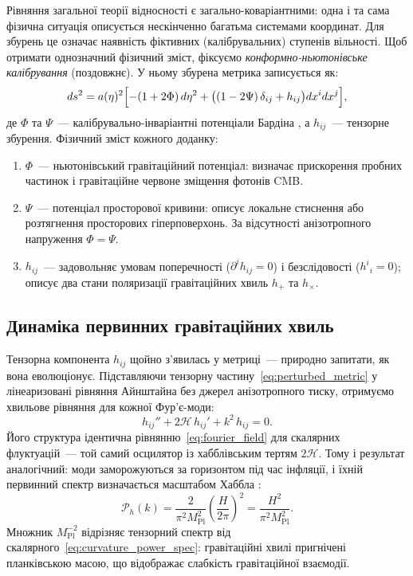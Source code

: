 \documentclass[12pt, a4paper]{article}
\begin{document}
Рівняння загальної теорії відносності є загально-коваріантними: одна і та сама фізична
ситуація описується нескінченно багатьма системами координат.
Для збурень це означає наявність фіктивних (калібрувальних)
ступенів вільності. Щоб отримати однозначний фізичний зміст,
фіксуємо \emph{конформно-ньютонівське калібрування} (поздовжнє).
У ньому збурена метрика записується як:
\begin{equation}\label{eq:perturbed_metric}
  ds^2 = a(\eta)^2\Bigl[
    -(1 + 2\Phi)\,d\eta^2
    + \bigl((1 - 2\Psi)\,\delta_{ij} + h_{ij}\bigr)
      dx^i dx^j
  \Bigr],
\end{equation}
де $\Phi$ та $\Psi$~--- калібрувально-інваріантні потенціали
Бардіна \cite{bardeen_1980}, а $h_{ij}$~--- тензорне збурення.
Фізичний зміст кожного доданку:
\begin{enumerate}
  \item $\Phi$~--- ньютонівський гравітаційний потенціал:
        визначає прискорення пробних частинок і гравітаційне
        червоне зміщення фотонів CMB.
  \item $\Psi$~--- потенціал просторової кривини: описує
        локальне стиснення або розтягнення просторових
        гіперповерхонь. За відсутності анізотропного напруження
        $\Phi = \Psi$.
  \item $h_{ij}$~--- задовольняє умовам поперечності
        ($\partial^i h_{ij} = 0$) і безслідовості
        ($h^i{}_i = 0$); описує два стани поляризації
        гравітаційних хвиль $h_+$ та $h_\times$.
\end{enumerate}

\subsection{Динаміка первинних гравітаційних хвиль}

Тензорна компонента $h_{ij}$ щойно з'явилась у метриці~---
природно запитати, як вона еволюціонує. Підставляючи тензорну
частину~\eqref{eq:perturbed_metric} у лінеаризовані рівняння
Айнштайна без джерел анізотропного тиску, отримуємо хвильове
рівняння для кожної Фур'є-моди:
\begin{equation}\label{eq:tensor_wave_eq}
  h_{ij}'' + 2\mathcal{H}\,h_{ij}' + k^2\,h_{ij} = 0.
\end{equation}
Його структура ідентична рівнянню~\eqref{eq:fourier_field}
для скалярних флуктуацій~--- той самий осцилятор із
хабблівським тертям $2\mathcal{H}$. Тому і результат
аналогічний: моди заморожуються за горизонтом під час
інфляції, і їхній первинний спектр визначається масштабом
Хаббла \cite{starobinsky_1979}:
\begin{equation}\label{eq:tensor_power_spec}
  \mathcal{P}_h(k)
    = \frac{2}{\pi^2 M_\mathrm{Pl}^2}
      \left(\frac{H}{2\pi}\right)^{\!2}
    = \frac{H^2}{\pi^2 M_\mathrm{Pl}^2}.
\end{equation}
Множник $M_\mathrm{Pl}^{-2}$ відрізняє тензорний спектр від
скалярного~\eqref{eq:curvature_power_spec}: гравітаційні хвилі
пригнічені планківською масою, що відображає слабкість
гравітаційної взаємодії.
\end{document}
